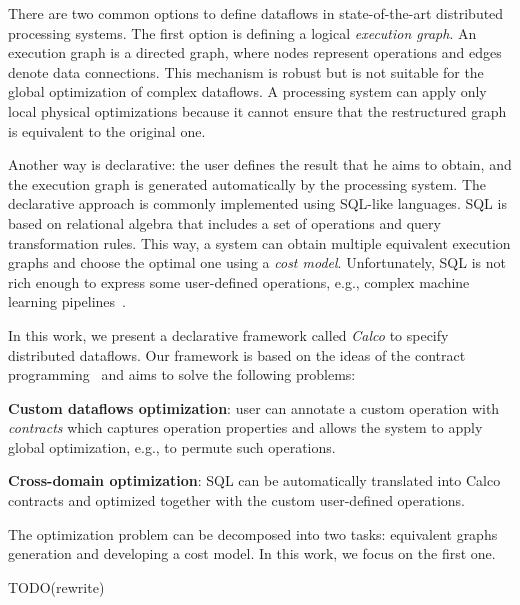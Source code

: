 There are two common options to define dataflows in state-of-the-art distributed processing systems.
The first option is defining a logical {\em execution graph}.
An execution graph is a directed graph, where nodes represent operations and edges denote data connections.
This mechanism is robust but is not suitable for the global optimization of complex dataflows.
A processing system can apply only local physical optimizations because it cannot ensure that the restructured graph is equivalent to the original one.

Another way is declarative: the user defines the result that he aims to obtain, and the execution graph is generated automatically by the processing system.
The declarative approach is commonly implemented using SQL-like languages.
SQL is based on relational algebra that includes a set of operations and query transformation rules.
This way, a system can obtain multiple equivalent execution graphs and choose the optimal one using a {\em cost model}.
Unfortunately, SQL is not rich enough to express some user-defined operations, e.g., complex machine learning pipelines~\cite{schule2019mlearn}.

In this work, we present a declarative framework called {\em Calco} to specify distributed dataflows.
Our framework is based on the ideas of the contract programming~\cite{meyer2002design} and aims to solve the following problems:

{\bf Custom dataflows optimization}: user can annotate a custom operation with {\em contracts} which captures operation properties and allows the system to apply global optimization, e.g., to permute such operations.

{\bf Cross-domain optimization}: SQL can be automatically translated into Calco contracts and optimized together with the custom user-defined operations.

The optimization problem can be decomposed into two tasks: equivalent graphs generation and developing a cost model.
In this work, we focus on the first one.

TODO(rewrite)
